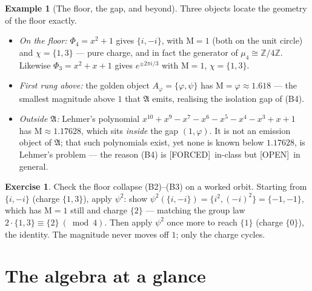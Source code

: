 \documentclass[11pt]{article}
\newcommand{\A}{𝔄}
\theoremstyle{plain}
\theoremstyle{definition}
\newtheorem{example}[theorem]{Example}
\newtheorem{exercise}[theorem]{Exercise}
\theoremstyle{remark}
\newcommand{\Forced}{\textcolor{forcedc}{[FORCED]}}
\newcommand{\Openq}{\textcolor{openc}{[OPEN]}}
\newcommand{\Mah}{\mathrm{M}}
\begin{document}
\begin{example}[The floor, the gap, and beyond]\label{ex:floor}
Three objects locate the geometry of the floor exactly.
\begin{itemize}[leftmargin=1.4em,itemsep=1pt]
\item \emph{On the floor:} $Φ_4=x^{2}+1$ gives $\{i,-i\}$, with $\Mah=1$ (both on the unit circle) and $χ=\{1,3\}$ --- pure charge, and in fact the generator of $μ_4≅ℤ/4ℤ$. Likewise $Φ_3=x^{2}+x+1$ gives $e^{\pm2πi/3}$ with $\Mah=1$, $χ=\{1,3\}$.
\item \emph{First rung above:} the golden object $A_φ=\{φ,ψ\}$ has $\Mah=φ≈1.618$ --- the smallest magnitude above $1$ that $\A$ emits, realising the isolation gap of (B4).
\item \emph{Outside $\A$:} Lehmer's polynomial $x^{10}+x^{9}-x^{7}-x^{6}-x^{5}-x^{4}-x^{3}+x+1$ has $\Mah≈1.17628$, which sits \emph{inside} the gap $(1,φ)$. It is not an emission object of $\A$; that such polynomials exist, yet none is known below $1.17628$, is Lehmer's problem --- the reason (B4) is \Forced\ in-class but \Openq\ in general.
\end{itemize}
\end{example}

\begin{exercise}\label{exr:floor-collapse}
Check the floor collapse (B2)--(B3) on a worked orbit. Starting from $\{i,-i\}$ (charge $\{1,3\}$), apply $ψ^{2}$: show $ψ^{2}(\{i,-i\})=\{i^{2},(-i)^{2}\}=\{-1,-1\}$, which has $\Mah=1$ still and charge $\{2\}$ --- matching the group law $2\cdot\{1,3\}\equiv\{2\}\ (\bmod4)$. Then apply $ψ^{2}$ once more to reach $\{1\}$ (charge $\{0\}$), the identity. The magnitude never moves off $1$; only the charge cycles.
\end{exercise}

\appendix
\section{The algebra at a glance}\label{app:glance}
\end{document}
